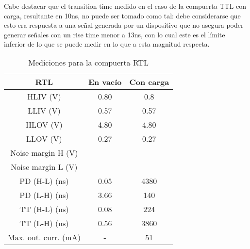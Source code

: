 \documentclass[../../e3_tp2_main.tex]{subfiles}
\begin{document}
Cabe destacar que el transition time medido en el caso de la compuerta TTL con carga, resultante en 10ns, no puede ser tomado como tal: debe considerarse que esto era respuesta a una se\~nal generada por un dispositivo que no asegura poder generar se\~nales con un rise time menor a 13ns, con lo cual este es el l\'imite inferior de lo que se puede medir en lo que a esta magnitud respecta.\par


\begin{table}[H]
	\centering
	\begin{tabular}{|c|c|c|}
	\hline
        RTL                          	& En vac\'io	& Con carga \\ \hline \hline
	HLIV (V)                    & 0.80              	& 0.8           \\ \hline
	LLIV (V)                    	& 0.57               & 0.57         \\ \hline
	HLOV (V)                  	& 4.80               & 4.80         \\ \hline
	LLOV (V)                   	& 0.27               & 0.27                              \\ \hline
	Noise margin H (V)     &                      &                                \\ \hline
	Noise margin L (V)	&			&				\\ \hline
	PD (H-L) (ns)		& 0.05               & 4380                        \\ \hline
	PD (L-H) (ns) 		& 3.66               & 140             \\ \hline
	TT (H-L) (ns)   		& 0.08               & 224                   \\ \hline
	TT (L-H) (ns)   		& 0.56               & 3860                   \\ \hline
	Max. out. curr. (mA)   & -                    & 51                     \\ \hline

	\end{tabular}
	
	\caption{Mediciones para la compuerta RTL}
	\label{table:1-mediciones-rtl}
\end{table}
\end{document}
